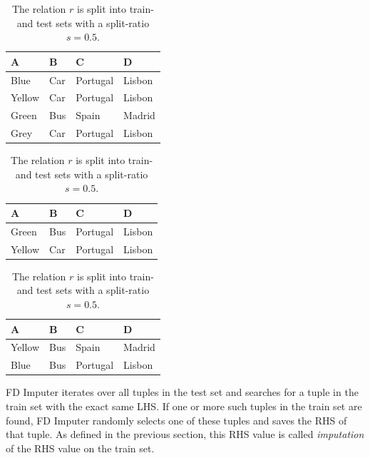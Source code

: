 \begin{table}[ht]
    \begin{subtable}[c]{0.9\textwidth}
        \centering
        \begin{tabular}{llll}
            \textsc{A} & \textsc{B} & \textsc{C} & \textsc{D} \\
        \toprule
        \toprule
        Blue & Car & Portugal & Lisbon \\
        Yellow & Car & Portugal & Lisbon  \\
        Green & Bus & Spain & Madrid  \\
        Grey & Car & Portugal & Lisbon  \\
        \bottomrule
        \bottomrule
        \end{tabular}
    \end{subtable}
    \begin{subtable}[c]{0.45\textwidth}
        \centering
        \begin{tabular}{llll}
            \textsc{A} & \textsc{B} & \textsc{C} & \textsc{D}  \\
        \toprule
        \toprule
            Green & Bus & Portugal & Lisbon \\
            Yellow & Car & Portugal & Lisbon \\
        \bottomrule
        \bottomrule
        \end{tabular}
    \end{subtable}
    \begin{subtable}[c]{0.45\textwidth}
        \centering
        \begin{tabular}{llll}
        \textsc{A} & \textsc{B} & \textsc{C} & \textsc{D} \\
        \toprule
        \toprule
        Yellow & Bus & Spain & Madrid \\
        Blue & Bus & Portugal & Lisbon \\
        \bottomrule
        \bottomrule
        \end{tabular}
    \end{subtable}
    \caption{The relation \( r \) is split into train- and test sets with a split-ratio \( s = 0.5 \). }
    \label{tab:split-example-fd-imputer}
\end{table}

FD Imputer iterates over all tuples in the test set and searches for a tuple in the train set with the exact same LHS.
If one or more such tuples in the train set are found, FD Imputer randomly selects one of these tuples and saves the RHS of that tuple.
As defined in the previous section, this RHS value is called \emph{imputation} of the RHS value on the train set.

